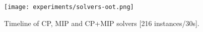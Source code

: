 \documentclass[../../thesis.tex]{subfiles}
\begin{document}


\begin{figure}
  \label{experiments:solvers:oot}
  \caption{Timeline of CP, MIP and CP+MIP solvers [216 instances/30s].}
  \centering
  \texttt{[image: experiments/solvers-oot.png]}
\end{figure}




\end{document}
